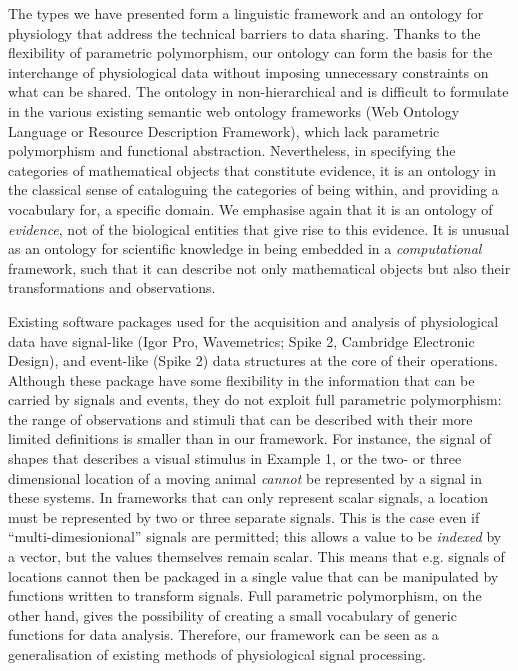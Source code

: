 The types we have presented form a linguistic framework and an ontology for
physiology that address the technical barriers to data sharing. Thanks to the
flexibility of parametric polymorphism, our ontology can form the basis for
the interchange of physiological data without imposing unnecessary constraints
on what can be shared. The ontology in non-hierarchical and is difficult to
formulate in the various existing semantic web ontology frameworks (Web
Ontology Language or Resource Description Framework), which lack parametric
polymorphism and functional abstraction. Nevertheless, in specifying the
categories of mathematical objects that constitute evidence, it is an ontology
in the classical sense of cataloguing the categories of being within,
and providing a vocabulary for, a specific domain. We emphasise again
that it is an ontology of \emph{evidence}, not of the biological entities that
give rise to this evidence. It is unusual as an ontology for scientific
knowledge in being embedded in a \emph{computational} framework, such that it
can describe not only mathematical objects but also their transformations and
observations.

Existing software packages used for the acquisition and analysis of
physiological data have signal-like (Igor Pro, Wavemetrics; Spike 2,
Cambridge Electronic Design), and event-like (Spike 2) data structures
at the core of their operations. Although these package have some
flexibility in the information that can be carried by signals and
events, they do not exploit full parametric polymorphism: the range of
observations and stimuli that can be described with their more limited
definitions is smaller than in our framework. For instance, the signal
of shapes that describes a visual stimulus in Example 1, or the two-
or three dimensional location of a moving animal \emph{cannot} be
represented by a signal in these systems. In frameworks that can only
represent scalar signals, a location must be represented by two or
three separate signals. This is the case even if
``multi-dimesionional'' signals are permitted; this allows a value to
be \emph{indexed} by a vector, but the values themselves remain
scalar. This means that e.g. signals of locations cannot then be
packaged in a single value that can be manipulated by functions
written to transform signals. Full parametric polymorphism, on the
other hand, gives the possibility of creating a small vocabulary of
generic functions for data analysis. Therefore, our framework can be
seen as a generalisation of existing methods of physiological signal
processing.


